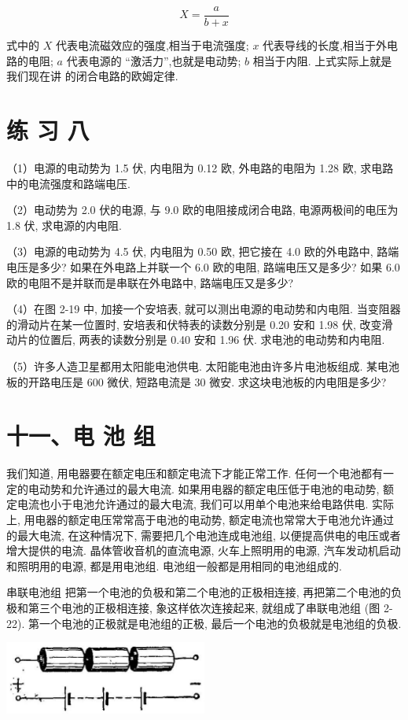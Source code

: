 \documentclass[10pt]{article}
\begin{document}
\[
X = \frac{a}{b + x}
\]

式中的 \(X\) 代表电流磁效应的强度,相当于电流强度; \(x\) 代表导线的长度,相当于外电路的电阻; \(a\) 代表电源的 “激活力”,也就是电动势; \(b\) 相当于内阻. 上式实际上就是我们现在讲 的闭合电路的欧姆定律.

\section*{练 习 八}

（1）电源的电动势为 1.5 伏, 内电阻为 0.12 欧, 外电路的电阻为 1.28 欧, 求电路中的电流强度和路端电压.

（2）电动势为 2.0 伏的电源, 与 9.0 欧的电阻接成闭合电路, 电源两极间的电压为 1.8 伏, 求电源的内电阻.

（3）电源的电动势为 4.5 伏, 内电阻为 0.50 欧, 把它接在 4.0 欧的外电路中, 路端电压是多少? 如果在外电路上并联一个 6.0 欧的电阻, 路端电压又是多少? 如果 6.0 欧的电阻不是并联而是串联在外电路中, 路端电压又是多少?

（4）在图 2-19 中, 加接一个安培表, 就可以测出电源的电动势和内电阻. 当变阻器的滑动片在某一位置时, 安培表和伏特表的读数分别是 0.20 安和 1.98 伏, 改变滑动片的位置后, 两表的读数分别是 0.40 安和 1.96 伏. 求电池的电动势和内电阻.

（5）许多人造卫星都用太阳能电池供电. 太阳能电池由许多片电池板组成. 某电池板的开路电压是 600 微伏, 短路电流是 30 微安. 求这块电池板的内电阻是多少?

\section*{十一、电 池 组}

我们知道, 用电器要在额定电压和额定电流下才能正常工作. 任何一个电池都有一定的电动势和允许通过的最大电流. 如果用电器的额定电压低于电池的电动势, 额定电流也小于电池允许通过的最大电流, 我们可以用单个电池来给电路供电. 实际上, 用电器的额定电压常常高于电池的电动势, 额定电流也常常大于电池允许通过的最大电流, 在这种情况下, 需要把几个电池连成电池组, 以便提高供电的电压或者增大提供的电流. 晶体管收音机的直流电源, 火车上照明用的电源, 汽车发动机启动和照明用的电源, 都是用电池组. 电池组一般都是用相同的电池组成的.

串联电池组 把第一个电池的负极和第二个电池的正极相连接, 再把第二个电池的负极和第三个电池的正极相连接, 象这样依次连接起来, 就组成了串联电池组 (图 2-22). 第一个电池的正极就是电池组的正极, 最后一个电池的负极就是电池组的负极.

\begin{center}
\includegraphics[max width=0.5\textwidth]{images/01913056-1f15-74d8-9184-9aab52c9d66b_92_410204.jpg}
\end{center}
\end{document}
